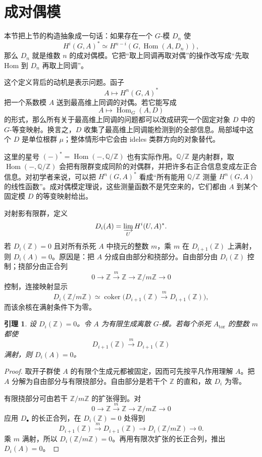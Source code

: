 \documentclass[11pt,a4paper,openany]{ctexbook}
\numberwithin{equation}{chapter}
\newcommand{\Q}{\mathbb{Q}}
\newcommand{\Z}{\mathbb{Z}}
\newcommand{\Hom}{\operatorname{Hom}}
\theoremstyle{plain}
\newtheorem{lemma}[theorem]{引理}
\theoremstyle{definition}
\theoremstyle{remark}
\begin{document}
\section{成对偶模}

本节把上节的构造抽象成一句话：如果存在一个 $G$-模 $D_n$ 使
\[
H^i(G,A)^*\simeq H^{n-i}(G,\Hom(A,D_n)),
\]
那么 $D_n$ 就是维数 $n$ 的成对偶模。它把“取上同调再取对偶”的操作改写成“先取 Hom 到 $D_n$ 再取上同调”。

这个定义背后的动机是表示问题。函子
\[
A\longmapsto H^n(G,A)^*
\]
把一个系数模 $A$ 送到最高维上同调的对偶。若它能写成
\[
A\longmapsto \Hom_G(A,D)
\]
的形式，那么所有关于最高维上同调的问题都可以改成研究一个固定对象 $D$ 中的 $G$-等变映射。换言之，$D$ 收集了最高维上同调能检测到的全部信息。局部域中这个 $D$ 是单位根群 $\mu$；整体情形中它会由 ideles 类群方向的对象替代。

这里的星号 $(-)^*=\Hom(-,\Q/\Z)$ 也有实际作用。$\Q/\Z$ 是内射群，取 $\Hom(-,\Q/\Z)$ 会把有限群变成同阶的对偶群，并把许多右正合信息变成左正合信息。对初学者来说，可以把 $H^n(G,A)^*$ 看成“所有能用 $\Q/\Z$ 测量 $H^n(G,A)$ 的线性函数”。成对偶模定理说，这些测量函数不是凭空来的，它们都由 $A$ 到某个固定模 $D$ 的等变映射给出。

对射影有限群，定义
\[
D_i(A)=\varinjlim_U H^i(U,A)^*.
\]
若 $D_i(\Z)=0$ 且对所有杀死 $A$ 中挠元的整数 $m$，乘 $m$ 在 $D_{i+1}(\Z)$ 上满射，则 $D_i(A)=0$。原因是：把 $A$ 分成自由部分和挠部分。自由部分由 $D_i(\Z)$ 控制；挠部分由正合列
\[
0\to \Z\xrightarrow{m}\Z\to \Z/m\Z\to 0
\]
控制，连接映射显示
\[
D_i(\Z/m\Z)\simeq \operatorname{coker}\bigl(D_{i+1}(\Z)\xrightarrow{m}D_{i+1}(\Z)\bigr),
\]
而该余核在满射条件下为零。

\begin{lemma}
设 $D_i(\Z)=0$。令 $A$ 为有限生成离散 $G$-模。若每个杀死 $A_{\mathrm{tor}}$ 的整数 $m$ 都使
\[
D_{i+1}(\Z)\xrightarrow{m}D_{i+1}(\Z)
\]
满射，则 $D_i(A)=0$。
\end{lemma}

\begin{proof}
取开子群使 $A$ 的有限个生成元都被固定，因而可先按平凡作用理解 $A$。把 $A$ 分解为自由部分与有限挠部分。自由部分是若干个 $\Z$ 的直和，故 $D_i$ 为零。

有限挠部分可由若干 $\Z/m\Z$ 的扩张得到。对
\[
0\to \Z\xrightarrow{m}\Z\to \Z/m\Z\to 0
\]
应用 $D_\bullet$ 的长正合列，在 $D_i(\Z)=0$ 处得到
\[
D_{i+1}(\Z)\xrightarrow{m}D_{i+1}(\Z)\to D_i(\Z/m\Z)\to 0.
\]
乘 $m$ 满射，所以 $D_i(\Z/m\Z)=0$。再用有限次扩张的长正合列，推出 $D_i(A)=0$。
\end{proof}
\end{document}
